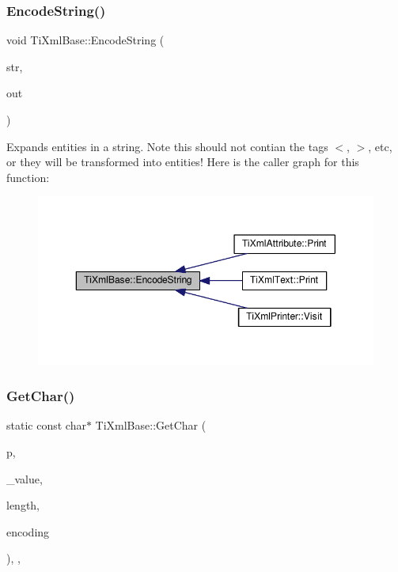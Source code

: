 \subsubsection{\texorpdfstring{Encode\+String()}{EncodeString()}}
{\footnotesize\ttfamily void Ti\+Xml\+Base\+::\+Encode\+String (\begin{DoxyParamCaption}\item[{const \hyperlink{tinyxml_8h_a92bada05fd84d9a0c9a5bbe53de26887}{T\+I\+X\+M\+L\+\_\+\+S\+T\+R\+I\+NG} \&}]{str,  }\item[{\hyperlink{tinyxml_8h_a92bada05fd84d9a0c9a5bbe53de26887}{T\+I\+X\+M\+L\+\_\+\+S\+T\+R\+I\+NG} $\ast$}]{out }\end{DoxyParamCaption})\hspace{0.3cm}{\ttfamily [static]}}

Expands entities in a string. Note this should not contian the tag\textquotesingle{}s \textquotesingle{}$<$\textquotesingle{}, \textquotesingle{}$>$\textquotesingle{}, etc, or they will be transformed into entities! Here is the caller graph for this function\+:\nopagebreak
\begin{figure}[H]
\begin{center}
\leavevmode
\includegraphics[width=350pt]{class_ti_xml_base_a32ed202562b58de64c7d799ca3c9db98_icgraph}
\end{center}
\end{figure}
\mbox{\label{class_ti_xml_base_a5b0fde72d6f662ae1fd6303195d2159b}} 
\subsubsection{\texorpdfstring{Get\+Char()}{GetChar()}}
{\footnotesize\ttfamily static const char$\ast$ Ti\+Xml\+Base\+::\+Get\+Char (\begin{DoxyParamCaption}\item[{const char $\ast$}]{p,  }\item[{char $\ast$}]{\+\_\+value,  }\item[{int $\ast$}]{length,  }\item[{\hyperlink{tinyxml_8h_a88d51847a13ee0f4b4d320d03d2c4d96}{Ti\+Xml\+Encoding}}]{encoding }\end{DoxyParamCaption})\hspace{0.3cm}{\ttfamily [inline]}, {\ttfamily [static]}, {\ttfamily [protected]}}

